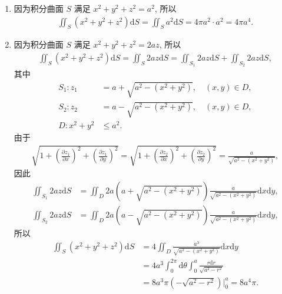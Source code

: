 \documentclass[../../main.tex]{subfiles}%
\begin{document}
\begin{solution}
\begin{enumerate}[(1)]
\item 因为积分曲面 $S$ 满足 $x^2+y^2+z^2=a^2$, 所以
\begin{align*}
\iint_S (x^2+y^2+z^2)\mathrm{d}S = \iint_S a^2\mathrm{d}S = 4\pi a^2\cdot a^2 = 4\pi a^4.
\end{align*}
\item 因为积分曲面 $S$ 满足 $x^2+y^2+z^2=2az$, 所以
\begin{align*}
\iint_S (x^2+y^2+z^2)\mathrm{d}S = \iint_S 2az\mathrm{d}S = \iint_{S_1} 2az\mathrm{d}S + \iint_{S_2} 2az\mathrm{d}S,
\end{align*}
其中
\begin{align*}
S_1: z_1 &= a+\sqrt{a^2-(x^2+y^2)}, \quad (x,y)\in D, \\
S_2: z_2 &= a-\sqrt{a^2-(x^2+y^2)}, \quad (x,y)\in D, \\
D: x^2+y^2 &\leqslant a^2.
\end{align*}
由于
\begin{align*}
\sqrt{1+\left(\frac{\partial z_1}{\partial x}\right)^2+\left(\frac{\partial z_1}{\partial y}\right)^2} = \sqrt{1+\left(\frac{\partial z_2}{\partial x}\right)^2+\left(\frac{\partial z_2}{\partial y}\right)^2} = \frac{a}{\sqrt{a^2-(x^2+y^2)}},
\end{align*}
因此
\begin{align*}
\iint_{S_1} 2az\mathrm{d}S &= \iint_D 2a(a+\sqrt{a^2-(x^2+y^2)})\frac{a}{\sqrt{a^2-(x^2+y^2)}}\mathrm{d}x\mathrm{d}y, \\
\iint_{S_2} 2az\mathrm{d}S &= \iint_D 2a(a-\sqrt{a^2-(x^2+y^2)})\frac{a}{\sqrt{a^2-(x^2+y^2)}}\mathrm{d}x\mathrm{d}y,
\end{align*}
所以
\begin{align*}
\iint_S (x^2+y^2+z^2)\mathrm{d}S &= 4\iint_D \frac{a^3}{\sqrt{a^2-(x^2+y^2)}}\mathrm{d}x\mathrm{d}y \\
&= 4a^3\int_0^{2\pi}\mathrm{d}\theta\int_0^a\frac{r\mathrm{d}r}{\sqrt{a^2-r^2}} \\
&= 8a^3\pi(-\sqrt{a^2-r^2})\Big|_0^a = 8a^4\pi.
\end{align*}
\end{enumerate}
\end{solution}
\end{document}
